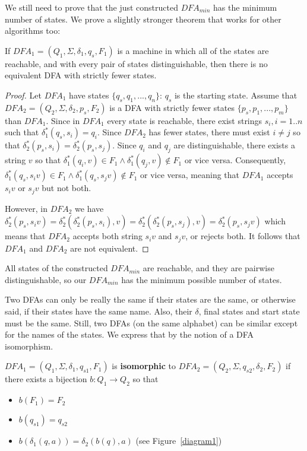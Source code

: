 
We still need to prove that the just constructed $DFA_{min}$ has the
minimum number of states. We prove a slightly stronger theorem that works for other algorithms too:

\begin{theorem}
If $DFA_1 = (Q_1,\Sigma,\delta_1,q_s,F_1)$ is a machine in which all of the
states are reachable, and with every pair of states distinguishable,
then there is no equivalent DFA with strictly fewer states.
\end{theorem}
\begin{proof}
Let $DFA_1$ have states $\{q_s,q_1,...,q_n\}$: $q_s$ is the starting
state. Assume that
%
$DFA_2 = (Q_2,\Sigma,\delta_2,p_s,F_2)$ is a DFA with strictly fewer
states $\{p_s,p_1,...,p_m\}$ than $DFA_1$. Since in $DFA_1$ every state is reachable, there exist strings $s_i, i=1..n$ such that $\delta_1^*(q_s,s_i) = q_i$. Since $DFA_2$ has fewer states, there must exist $i \neq j$ so that $\delta_2^*(p_s,s_i) = \delta_2^*(p_s,s_j)$. Since $q_i$ and $q_j$ are distinguishable, there exists a string $v$ so that $\delta_1^*(q_i,v) \in F_1 \wedge \delta_1^*(q_j,v) \notin F_1$ or vice versa. Consequently, $\delta_1^*(q_s,s_iv) \in F_1 \wedge \delta_1^*(q_s,s_jv) \notin F_1$ or vice versa, meaning that $DFA_1$ accepts $s_iv$ or $s_jv$ but not both.

However, in $DFA_2$ we have $\delta_2^*(p_s,s_iv) = \delta_2^*(\delta_2^*(p_s,s_i),v) =
\delta_2^*(\delta_2^*(p_s,s_j),v) = \delta_2^*(p_s,s_jv)$ which means that $DFA_2$ accepts both string $s_iv$ and $s_jv$, or rejects both. It follows that $DFA_1$ and $DFA_2$ are not equivalent.
\end{proof}

All states of the constructed $DFA_{min}$ are reachable, and they are
pairwise distinguishable, so our $DFA_{min}$ has the minimum possible
number of states.

Two DFAs can only be really the same if their states are the same, or
otherwise said, if their states have the same name. Also, their
$\delta$, final states and start state must be the same. Still, two
DFAs (on the same alphabet) can be similar except for the names of the
states. We express that by the notion of a DFA isomorphism.

\begin{definition}
$DFA_1 = (Q_1,\Sigma,\delta_1,q_{s1},F_1)$ is {\bf isomorphic} to
  $DFA_2 = (Q_2,\Sigma,q_{s2},\delta_2,F_2)$ if there exists a
  bijection $b: Q_1 \rightarrow Q_2$ so that
\begin{itemize}
	\item $b(F_1) = F_2$
	\item $b(q_{s1}) = q_{s2}$
	\item $b(\delta_1(q,a)) = \delta_2(b(q),a)$ (see Figure~\ref{diagram1})
\end{itemize}
\end{definition}

